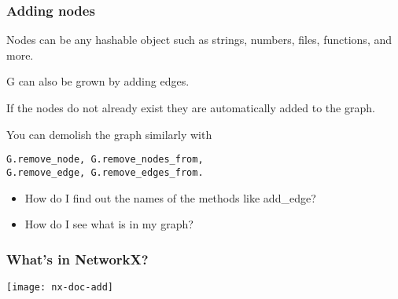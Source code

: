 \documentclass[xcolor=dvipsnames, 9pt]{beamer}
\begin{document}

\begin{frame}[fragile]
\frametitle{Adding nodes}

\begin{block}{}

\end{block}

Nodes can be any hashable object such as strings,
numbers, files, functions, and more.

\end{frame}



\begin{frame}[fragile]

G can also be grown by adding edges.

\begin{block}{}


\end{block}

If the nodes do not already exist they are automatically added to the graph.

You can demolish the graph similarly with 
\begin{verbatim}
G.remove_node, G.remove_nodes_from, 
G.remove_edge, G.remove_edges_from.
\end{verbatim}

\end{frame}



\begin{frame}
\Large
\begin{itemize}

\item How do I find out the names of the methods like add\_edge?

\item How do I see what is in my graph?

\end{itemize}
\end{frame}

\begin{frame}
\frametitle{What's in NetworkX?}
\centerline{\texttt{[image: nx-doc-add]}}
\end{frame}
\end{document}
